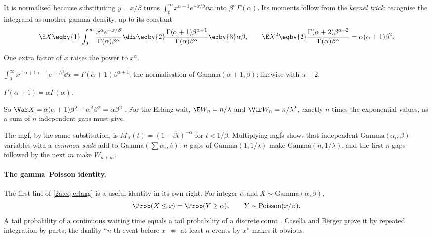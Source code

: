 It is normalised because substituting $y=x/\beta$ turns $\int_0^\infty x^{\alpha-1}e^{-x/\beta}\dd x$ into $\beta^\alpha\Gamma(\alpha)$. Its moments follow from the \emph{kernel trick}: recognise the integrand as another gamma density, up to its constant.
\begin{align*}
  \E X \eqby{1} \int_0^\infty\frac{x^{\alpha}e^{-x/\beta}}{\Gamma(\alpha)\beta^\alpha}\dd x
  \eqby{2} \frac{\Gamma(\alpha+1)\beta^{\alpha+1}}{\Gamma(\alpha)\beta^\alpha}
  \eqby{3} \alpha\beta,\qquad
  \E X^2 \eqby{2} \frac{\Gamma(\alpha+2)\beta^{\alpha+2}}{\Gamma(\alpha)\beta^\alpha}=\alpha(\alpha+1)\beta^2 .
\end{align*}
\begin{explain}
  \item One extra factor of $x$ raises the power to $x^\alpha$.
  \item $\int_0^\infty x^{(\alpha+1)-1}e^{-x/\beta}\dd x=\Gamma(\alpha+1)\beta^{\alpha+1}$, the normalisation of Gamma$(\alpha+1,\beta)$; likewise with $\alpha+2$.
  \item $\Gamma(\alpha+1)=\alpha\Gamma(\alpha)$.
\end{explain}
So $\Var X=\alpha(\alpha+1)\beta^2-\alpha^2\beta^2=\alpha\beta^2$ . For the Erlang wait, $\E W_n=n/\lambda$ and $\Var W_n=n/\lambda^2$, exactly $n$ times the exponential values, as a sum of $n$ independent gaps must give.

The mgf, by the same substitution, is $M_X(t)=(1-\beta t)^{-\alpha}$ for $t<1/\beta$. Multiplying mgfs shows that independent $\mathrm{Gamma}(\alpha_i,\beta)$ variables with a \emph{common scale} add to $\mathrm{Gamma}(\sum\alpha_i,\beta)$: $n$ gaps of $\mathrm{Gamma}(1,1/\lambda)$ make $\mathrm{Gamma}(n,1/\lambda)$, and the first $n$ gaps followed by the next $m$ make $W_{n+m}$.

\paragraph{The gamma--Poisson identity.} The first line of \eqref{2a:eq:erlang} is a useful identity in its own right. For integer $\alpha$ and $X\sim\mathrm{Gamma}(\alpha,\beta)$,
\[
  \Prob(X\le x)=\Prob(Y\ge\alpha),\qquad Y\sim\mathrm{Poisson}(x/\beta).
\]
A tail probability of a continuous waiting time equals a tail probability of a discrete count . Casella and Berger prove it by repeated integration by parts; the duality ``$n$-th event before $x$ $\Leftrightarrow$ at least $n$ events by $x$'' makes it obvious.

